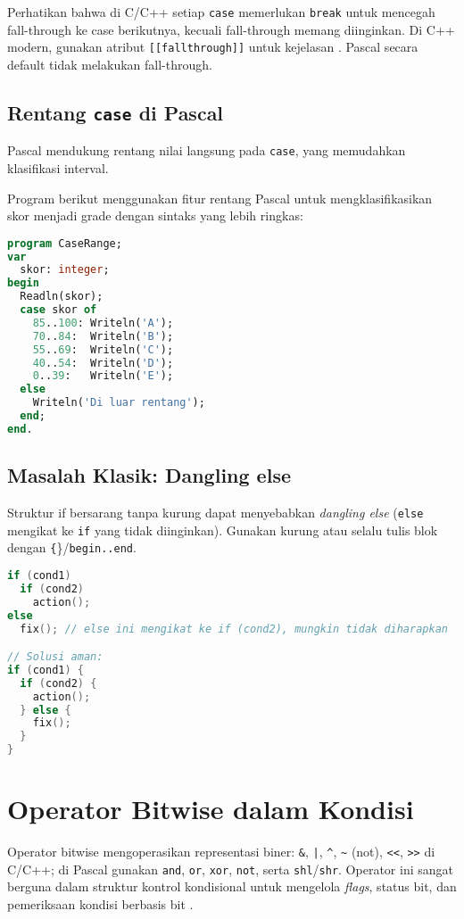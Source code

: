 \documentclass[../main.tex]{subfiles}
\begin{document}
Perhatikan bahwa di C/C++ setiap \texttt{case} memerlukan \texttt{break} untuk mencegah fall-through ke case berikutnya, kecuali fall-through memang diinginkan. Di C++ modern, gunakan atribut \texttt{[[fallthrough]]} untuk kejelasan \parencite{cpp-fallthrough-attr}. Pascal secara default tidak melakukan fall-through.

\subsection{Rentang \texttt{case} di Pascal}
Pascal mendukung rentang nilai langsung pada \texttt{case}, yang memudahkan klasifikasi interval.

Program berikut menggunakan fitur rentang Pascal untuk mengklasifikasikan skor menjadi grade dengan sintaks yang lebih ringkas:

\begin{lstlisting}[language=Pascal, caption={Rentang case di Pascal}]
program CaseRange;
var
  skor: integer;
begin
  Readln(skor);
  case skor of
    85..100: Writeln('A');
    70..84:  Writeln('B');
    55..69:  Writeln('C');
    40..54:  Writeln('D');
    0..39:   Writeln('E');
  else
    Writeln('Di luar rentang');
  end;
end.
\end{lstlisting}

\subsection{Masalah Klasik: Dangling else}
Struktur if bersarang tanpa kurung dapat menyebabkan \emph{dangling else} (\texttt{else} mengikat ke \texttt{if} yang tidak diinginkan). Gunakan kurung atau selalu tulis blok dengan \texttt\{\}/\texttt{begin..end}.
\begin{lstlisting}[language=C, caption={Dangling else dan solusinya}]
if (cond1)
  if (cond2)
    action();
else
  fix(); // else ini mengikat ke if (cond2), mungkin tidak diharapkan

// Solusi aman:
if (cond1) {
  if (cond2) {
    action();
  } else {
    fix();
  }
}
\end{lstlisting}

\section{Operator Bitwise dalam Kondisi}
Operator bitwise mengoperasikan representasi biner: \texttt{\&}, \texttt{|}, \texttt{\^{}}, \texttt{\~{}} (not), \texttt{\textless\textless}, \texttt{\textgreater\textgreater} di C/C++; di Pascal gunakan \texttt{and}, \texttt{or}, \texttt{xor}, \texttt{not}, serta \texttt{shl}/\texttt{shr}. Operator ini sangat berguna dalam struktur kontrol kondisional untuk mengelola \emph{flags}, status bit, dan pemeriksaan kondisi berbasis bit \parencite{free-pascal-docs,iso-c-draft-n1570,cpp-reference}.
\end{document}
